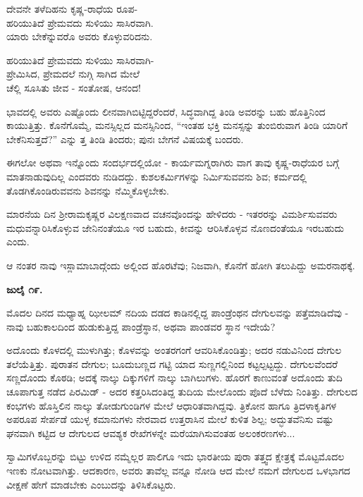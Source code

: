 \begin{myquote}
ದೇವನೇ ತಳೆದಿಹನು ಕೃಷ್ಣ-ರಾಧೆಯ ರೂಪ-\\ಹರಿಯುತಿದೆ ಪ್ರೇಮವದು ಸುಳಿಯು ಸಾಸಿರವಾಗಿ.\\ಯಾರು ಬೇಕೆನ್ನುವರೊ ಅವರು ಕೊಳ್ಳುವರಿದನು.
\end{myquote}

\begin{myquote}
ಹರಿಯುತಿದೆ ಪ್ರೇಮವದು ಸುಳಿಯು ಸಾಸಿರವಾಗಿ-\\ಪ್ರೇಮಿಸಿದ, ಪ್ರೇಮದಲೆ ನುಗ್ಗಿ ಸಾಗಿದ ಮೇಲೆ\\ಚೆಲ್ಲಿ ಸೂಸಿತು ಜೀವ - ಸಂತೋಷ, ಆನಂದ!
\end{myquote}

ಭಾವದಲ್ಲಿ ಅವರು ಎಷ್ಟೊಂದು ಲೀನವಾಗಿಬಿಟ್ಟಿದ್ದರೆಂದರೆ, ಸಿದ್ಧವಾಗಿದ್ದ ತಿಂಡಿ ಅವರನ್ನು ಬಹು ಹೊತ್ತಿನಿಂದ ಕಾಯುತ್ತಿತ್ತು. ಕೊನೆಗೊಮ್ಮೆ, ಮನಸ್ಸಿಲ್ಲದ ಮನಸ್ಸಿನಿಂದ, “ಇಂತಹ ಭಕ್ತಿ ಮನಸ್ಸನ್ನು ತುಂಬಿರುವಾಗ ತಿಂಡಿ ಯಾರಿಗೆ ಬೇಕೆನಿಸುತ್ತದೆ?” ಎನ್ನು ತ್ತ ತಿಂಡಿ ತಿಂದರು; ಪುನಃ ಬೇಗನೆ ವಿಷಯಕ್ಕೆ ಬಂದರು.

ಈಗಲೋ ಅಥವಾ ಇನ್ನೊಂದು ಸಂದರ್ಭದಲ್ಲಿಯೋ - ಕಾರ್ಯಮಗ್ನರಾಗಿರು ವಾಗ ತಾವು ಕೃಷ್ಣ-ರಾಧೆಯರ ಬಗ್ಗೆ ಮಾತನಾಡುವುದಿಲ್ಲ ಎಂದವರು ನುಡಿದದ್ದು. ಕುಶಲಕರ್ಮಿಗಳನ್ನು ನಿರ್ಮಿಸುವವನು ಶಿವ; ಕರ್ಮದಲ್ಲಿ ತೊಡಗಿಕೊಂಡಿರುವವನು ಶಿವನನ್ನು ನೆಮ್ಮಿಕೊಳ್ಳಬೇಕು.

ಮಾರನೆಯ ದಿನ ಶ‍್ರೀರಾಮಕೃಷ್ಣರ ವಿಲಕ್ಷಣವಾದ ವಚನವೊಂದನ್ನು ಹೇಳಿದರು - ಇತರರನ್ನು ವಿಮರ್ಶಿಸುವವರು ಮಧುವನ್ನಾರಿಸಿಕೊಳ್ಳುವ ಜೇನಿನಂತೆಯೂ ಇರ ಬಹುದು, ಕೀವನ್ನು ಆರಿಸಿಕೊಳ್ಳವ ನೊಣದಂತೆಯೂ ಇರಬಹುದು ಎಂದು.

ಆ ನಂತರ ನಾವು ಇಸ್ಲಾಮಾಬಾದ್ಗೆಂದು ಅಲ್ಲಿಂದ ಹೊರಟೆವು; ನಿಜವಾಗಿ, ಕೊನೆಗೆ ಹೋಗಿ ತಲುಪಿದ್ದು ಅಮರನಾಥಕ್ಕೆ.

\textbf{ಜುಲೈ ೧೯.}

ಮೊದಲ ದಿನದ ಮಧ್ಯಾಹ್ನ ಝೀಲಮ್​ ನದಿಯ ದಡದ ಕಾಡಿನಲ್ಲಿದ್ದ ಪಾಂಡ್ರೆಂಥನ ದೇಗುಲವನ್ನು ಪತ್ತೆಮಾಡಿದೆವು - ನಾವು ಬಹುಕಾಲದಿಂದ ಹುಡುಕುತ್ತಿದ್ದ ಪಾಂಡ್ರೆಸ್ಥಾನ, ಅಥವಾ ಪಾಂಡವರ ಸ್ಥಾನ ಇದೇಯೆ?

ಅದೊಂದು ಕೊಳದಲ್ಲಿ ಮುಳುಗಿತ್ತು; ಕೊಳವನ್ನು ಅಂತರಗಂಗೆ ಆವರಿಸಿಕೊಂಡಿತ್ತು; ಅದರ ನಡುವಿನಿಂದ ದೇಗುಲ ತಲೆಯೆತ್ತಿತ್ತು. ಪುರಾತನ ದೇಗುಲ; ಬೂದುಬಣ್ಣದ ಗಟ್ಟಿ ಯಾದ ಸುಣ್ಣಗಲ್ಲಿನಿಂದ ಕಟ್ಟಲ್ಪಟ್ಟದ್ದು. ದೇಗುಲವೆಂದರೆ ಸಣ್ಣದೊಂದು ಕೊಠಡಿ; ಅದಕ್ಕೆ ನಾಲ್ಕು ದಿಕ್ಕುಗಳಿಗೆ ನಾಲ್ಕು ಬಾಗಿಲುಗಳು. ಹೊರಗೆ ಕಾಣುವಂತೆ ಅದೊಂದು ತುದಿ ಚೂಪಾಗುತ್ತ ನಡೆದ ಪಿರಮಿಡ್ - ಅದರ ಕತ್ತರಿಸಿದಂತಿದ್ದ ತುದಿಯ ಮೇಲೊಂದು ಪೊದೆ ಬೆಳೆದು ನಿಂತಿತ್ತು. ದೇಗುಲದ ಕಂಭಗಳು ಹೊಸ್ತಿಲಿನ ನಾಲ್ಕು ತೋಡುಗುಂಡಿಗಳ ಮೇಲೆ ಆಧಾರಿತವಾಗಿದ್ದವು. ತ್ರಿಕೋನ ಹಾಗೂ ತ್ರಿದಳಾಕೃತಿಗಳ ಅಪರೂಪ ಸೇರ್ಪಡೆ ಯುಳ್ಳ ಕಮಾನುಗಳು ನೇರವಾದ ಉತ್ತರಾಸಿನ ಮೇಲೆ ಕುಳಿತ ಶಿಲ್ಪ; ಅದ್ಭುತವೆನಿಸು ವಷ್ಟು ಘನವಾಗಿ ಕಟ್ಟಿದ ಆ ದೇಗುಲದ ಆವಶ್ಯಕ ರೇಖೆಗಳನ್ನೇ ಮರೆಯಾಗಿಸುವಂತಹ ಅಲಂಕರಣಗಳು...

ಸ್ವಾಮಿಗಳೊಬ್ಬರನ್ನು ಬಿಟ್ಟು ಉಳಿದ ನಮ್ಮೆಲ್ಲರ ಪಾಲಿಗೂ ಇದು ಭಾರತೀಯ ಪುರಾ ತತ್ತ್ವದ ಕ್ಷೇತ್ರಕ್ಕೆ ಮೊಟ್ಟಮೊದಲ ಇಣಕು ನೋಟವಾಗಿತ್ತು. ಆದಕಾರಣ, ಅವರು ತಾವೆಲ್ಲ ವನ್ನೂ ನೋಡಿ ಆದ ಮೇಲೆ ನಮಗೆ ದೇಗುಲದ ಒಳಭಾಗದ ವೀಕ್ಷಣೆ ಹೇಗೆ ಮಾಡಬೇಕು ಎಂಬುದನ್ನು ತಿಳಿಸಿಕೊಟ್ಟರು.


